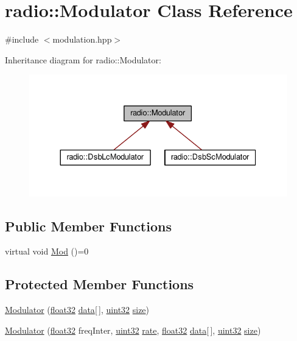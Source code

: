 \hypertarget{classradio_1_1Modulator}{\section{radio\+:\+:Modulator Class Reference}
\label{classradio_1_1Modulator}
}


{\ttfamily \#include $<$modulation.\+hpp$>$}



Inheritance diagram for radio\+:\+:Modulator\+:
\nopagebreak
\begin{figure}[H]
\begin{center}
\leavevmode
\includegraphics[width=330pt]{classradio_1_1Modulator__inherit__graph}
\end{center}
\end{figure}
\subsection*{Public Member Functions}
\begin{DoxyCompactItemize}
\item 
virtual void \hyperlink{classradio_1_1Modulator_a44e9de3acd9499b31da5064b039e7a15}{Mod} ()=0
\end{DoxyCompactItemize}
\subsection*{Protected Member Functions}
\begin{DoxyCompactItemize}
\item 
\hyperlink{classradio_1_1Modulator_a4ce73238d07f8703b7b905c9c6dba28e}{Modulator} (\hyperlink{definitions_8hpp_aacdc525d6f7bddb3ae95d5c311bd06a1}{float32} \hyperlink{classradio_1_1Modulator_a39d698f7720aa3677ecaf1baf83c8fa0}{data}\mbox{[}$\,$\mbox{]}, \hyperlink{definitions_8hpp_a1134b580f8da4de94ca6b1de4d37975e}{uint32} \hyperlink{classradio_1_1Modulator_ad1fbba4bdd6a8c8d2ff05cb7be60fc5c}{size})
\item 
\hyperlink{classradio_1_1Modulator_a07ffbd7e75e18027c60e77d4fc5b5e37}{Modulator} (\hyperlink{definitions_8hpp_aacdc525d6f7bddb3ae95d5c311bd06a1}{float32} freq\+Inter, \hyperlink{definitions_8hpp_a1134b580f8da4de94ca6b1de4d37975e}{uint32} \hyperlink{classradio_1_1Modulator_a8901a2170e850a767dd40f9494dd7536}{rate}, \hyperlink{definitions_8hpp_aacdc525d6f7bddb3ae95d5c311bd06a1}{float32} \hyperlink{classradio_1_1Modulator_a39d698f7720aa3677ecaf1baf83c8fa0}{data}\mbox{[}$\,$\mbox{]}, \hyperlink{definitions_8hpp_a1134b580f8da4de94ca6b1de4d37975e}{uint32} \hyperlink{classradio_1_1Modulator_ad1fbba4bdd6a8c8d2ff05cb7be60fc5c}{size})
\end{DoxyCompactItemize}
